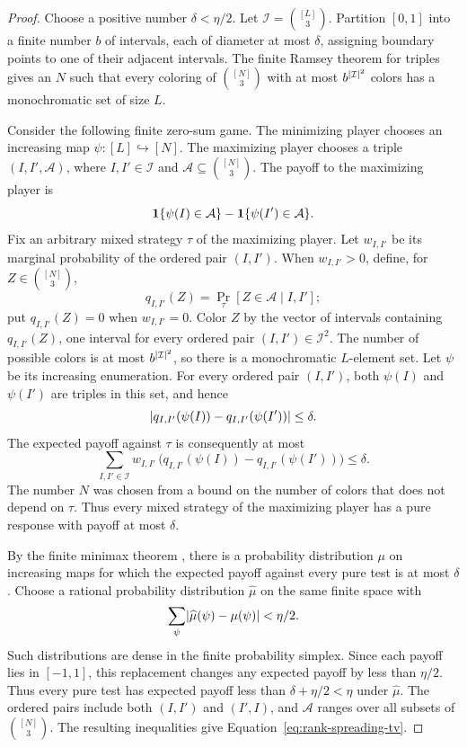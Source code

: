 \begin{proof}
Choose a positive number $\delta<\eta/2$.  Let
$\mathcal I=\binom{[L]}{3}$.  Partition $[0,1]$ into a finite number $b$ of
intervals, each of diameter at most $\delta$, assigning boundary points to one
of their adjacent intervals.  The finite Ramsey theorem for triples
\cite[Theorem~B]{Ramsey1930} gives an $N$ such that every coloring of
$\binom{[N]}{3}$ with at most $b^{\lvert\mathcal I\rvert^2}$ colors has a
monochromatic set of size $L$.

Consider the following finite zero-sum game.  The minimizing player chooses
an increasing map $\psi\colon[L]\hookrightarrow[N]$.  The maximizing player
chooses a triple $(I,I',\mathcal A)$, where $I,I'\in\mathcal I$ and
$\mathcal A\subseteq\binom{[N]}{3}$.  The payoff to the maximizing player is
\[
  \mathbf 1\{\psi(I)\in\mathcal A\}-\mathbf 1\{\psi(I')\in\mathcal A\}.
\]
Fix an arbitrary mixed strategy $\tau$ of the maximizing player.  Let
$w_{I,I'}$ be its marginal probability of the ordered pair $(I,I')$.  When
$w_{I,I'}>0$, define, for $Z\in\binom{[N]}{3}$,
\[
  q_{I,I'}(Z)=\Pr_{\tau}[Z\in\mathcal A\mid I,I'];
\]
put $q_{I,I'}(Z)=0$ when $w_{I,I'}=0$.
Color $Z$ by the vector of intervals containing $q_{I,I'}(Z)$, one interval
for every ordered pair $(I,I')\in\mathcal I^2$.  The number of possible
colors is at most $b^{\lvert\mathcal I\rvert^2}$, so there is a monochromatic
$L$-element set.  Let $\psi$ be its increasing enumeration.  For every
ordered pair $(I,I')$, both $\psi(I)$ and $\psi(I')$ are triples in this
set, and hence
\[
  \lvert q_{I,I'}(\psi(I))-q_{I,I'}(\psi(I'))\rvert\le\delta.
\]
The expected payoff against $\tau$ is consequently at most
\[
  \sum_{I,I'\in\mathcal I}w_{I,I'}\,
   \bigl(q_{I,I'}(\psi(I))-q_{I,I'}(\psi(I'))\bigr)
  \le\delta.
\]
The number $N$ was chosen from a bound on the number of colors that does
not depend on $\tau$.  Thus every mixed strategy of the maximizing player
has a pure response with payoff at most $\delta$.

By the finite minimax theorem \cite[Section~II.3]{vonNeumann1928}, there is a probability
distribution $\mu$ on increasing maps for which the expected payoff against
every pure test is at most $\delta$.  Choose a rational probability
distribution $\widehat\mu$ on the same finite space with
\[
  \sum_{\psi}\lvert\widehat\mu(\psi)-\mu(\psi)\rvert<\eta/2.
\]
Such distributions are dense in the finite probability simplex.  Since
each payoff lies in $[-1,1]$, this replacement changes any expected payoff
by less than $\eta/2$.  Thus every pure test has expected payoff less than
$\delta+\eta/2<\eta$ under $\widehat\mu$.  The ordered pairs include
both $(I,I')$ and $(I',I)$, and $\mathcal A$ ranges over all subsets of
$\binom{[N]}{3}$.  The resulting inequalities give
Equation~\eqref{eq:rank-spreading-tv}.
\end{proof}

